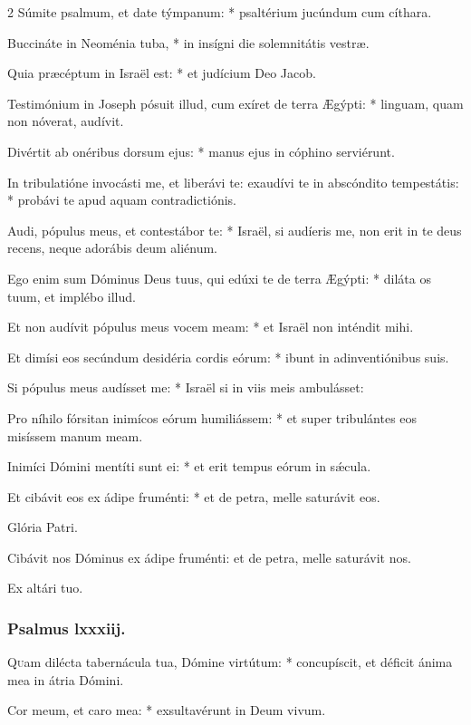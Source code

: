 \documentclass[9pt,twoside]{extarticle}
\begin{document}
\begin{multicols}{2}
Súmite psalmum, et date týmpanum: * psaltérium jucúndum cum cíthara.

Buccináte in Neoménia tuba, * in insígni die solemnitátis vestræ.

Quia præcéptum in Israël est: * et judícium Deo Jacob.

Testimónium in Joseph pósuit illud, cum exíret de terra Ægýpti: * linguam, quam non nóverat, audívit.

Divértit ab onéribus dorsum ejus: * manus ejus in cóphino serviérunt.

In tribulatióne invocásti me, et liberávi te: exaudívi te in abscóndito tempestátis: * probávi te apud aquam contradictiónis.

Audi, pópulus meus, et contestábor te: * Israël, si audíeris me, non erit in te deus recens, neque adorábis deum aliénum.

Ego enim sum Dóminus Deus tuus, qui edúxi te de terra Ægýpti: * diláta os tuum, et implébo illud.

Et non audívit pópulus meus vocem meam: * et Israël non inténdit mihi.

Et dimísi eos secúndum desidéria cordis eórum: * ibunt in adinventiónibus suis.

Si pópulus meus audísset me: * Israël si in viis meis ambulásset:

Pro níhilo fórsitan inimícos eórum humiliássem: * et super tribulántes eos misíssem manum meam.

Inimíci Dómini mentíti sunt ei: * et erit tempus eórum in sǽcula.

Et cibávit eos ex ádipe fruménti: * et de petra, melle saturávit eos.

Glória Patri.

\begin{tightlist}{}
\item {} Cibávit nos Dóminus ex ádipe fruménti: et de petra, melle saturávit nos.
\item {} Ex altári tuo.
\end{tightlist}

\subsubsection*{\center Psalmus lxxxiij.}
\lettrine{Q}uam dilécta tabernácula tua, Dómine virtútum: * concupíscit, et déficit ánima mea in átria Dómini.

Cor meum, et caro mea: * exsultavérunt in Deum vivum.


\end{multicols}
\end{document}
